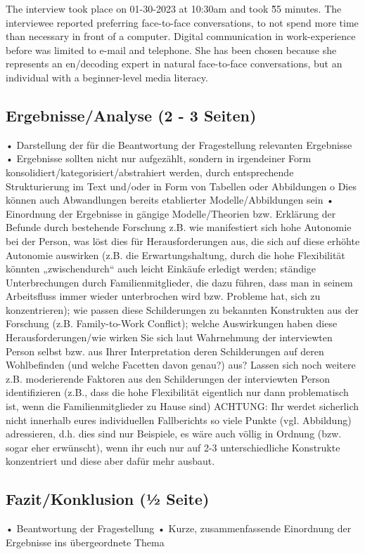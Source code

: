\documentclass[man]{apa7}
\begin{document}
The interview took place on 01-30-2023 at 10:30am and took \~55 minutes. The interviewee reported preferring face-to-face conversations, to not spend more time than necessary in front of a computer. Digital communication in work-experience before was limited to e-mail and telephone. She has been chosen because she represents an en/decoding expert in natural face-to-face conversations, but an individual with a beginner-level media literacy. 

\subsection{Ergebnisse/Analyse (2 - 3 Seiten)}
• Darstellung der für die Beantwortung der Fragestellung relevanten Ergebnisse
• Ergebnisse sollten nicht nur aufgezählt, sondern in irgendeiner Form
konsolidiert/kategorisiert/abstrahiert werden, durch entsprechende Strukturierung im Text und/oder in Form von Tabellen oder Abbildungen
o Dies können auch Abwandlungen bereits etablierter Modelle/Abbildungen sein
• Einordnung der Ergebnisse in gängige Modelle/Theorien bzw. Erklärung der Befunde durch
bestehende Forschung
z.B. wie manifestiert sich hohe Autonomie bei der Person, was löst dies für Herausforderungen aus, die sich auf diese erhöhte Autonomie auswirken (z.B. die Erwartungshaltung, durch die hohe Flexibilität könnten „zwischendurch“ auch leicht Einkäufe erledigt werden; ständige Unterbrechungen durch Familienmitglieder, die dazu führen, dass man in seinem Arbeitsfluss immer wieder unterbrochen wird bzw. Probleme hat, sich zu konzentrieren); wie passen diese Schilderungen zu bekannten Konstrukten aus der Forschung (z.B. Family-to-Work Conflict); welche Auswirkungen haben diese Herausforderungen/wie wirken Sie sich laut Wahrnehmung der interviewten Person selbst bzw. aus Ihrer Interpretation deren Schilderungen auf deren Wohlbefinden (und welche Facetten davon genau?) aus? Lassen sich noch weitere z.B. moderierende Faktoren aus den Schilderungen der interviewten Person identifizieren (z.B., dass die hohe Flexibilität eigentlich nur dann problematisch ist, wenn die Familienmitglieder zu Hause sind)
ACHTUNG: Ihr werdet sicherlich nicht innerhalb eures individuellen Fallberichts so viele Punkte (vgl. Abbildung) adressieren, d.h. dies sind nur Beispiele, es wäre auch völlig in Ordnung (bzw. sogar eher erwünscht), wenn ihr euch nur auf 2-3 unterschiedliche Konstrukte konzentriert und diese aber dafür mehr ausbaut.

\subsection{Fazit/Konklusion (1⁄2 Seite)}
• Beantwortung der Fragestellung
• Kurze, zusammenfassende Einordnung der Ergebnisse ins übergeordnete Thema

\printbibliography

\appendix
\end{document}
